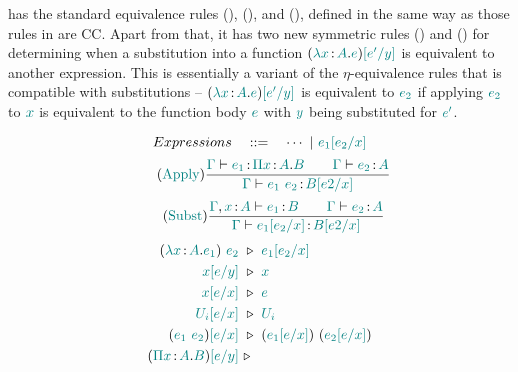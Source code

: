 {\ccs} has the standard equivalence rules (), (), and (), defined in the same way as those rules in are CC. Apart from that, it has two new symmetric rules () and () for determining when a substitution into a function 
$(\color{teal}{\lambda x}\color{black} \hspace{0.5mm}{:}\hspace{0.5mm} \color{teal}{A}\color{black} . \color{teal}{e}\color{black})\color{teal}{[e'\slash y]}\color{black}$ 
is equivalent to another expression. This is essentially a variant of the $\eta$-equivalence rules that is compatible with substitutions -- $(\color{teal}{\lambda x}\color{black} \hspace{0.5mm}{:}\hspace{0.5mm} \color{teal}{A}\color{black} . \color{teal}{e}\color{black})\color{teal}{[e'\slash y]}\color{black}$ is equivalent to $\color{teal}{e_2}\color{black}$ if applying $\color{teal}{e_2}\color{black}$ to $\color{teal}{x}\color{black}$ is equivalent to the function body $\color{teal}{e}\color{black}$ with $\color{teal}{y}\color{black}$ being substituted for $\color{teal}{e'}\color{black}$.

\begin{figure}
\renewcommand{\arraystretch}{1.3}
	\begin{equation*}
		Expressions \quad ::= \quad \cdots\ |\ \helper{e_1\sub{e_2}{x}} 
	\end{equation*}
	\begin{equation}
		\tag{\helper{Apply}}
		\frac
			{\helper{\Gamma} \vdash \helper{e_1} \goodcolon \helper{\Pi x} \goodcolon \helper{A}. \helper{B} \qquad 
			\helper{\Gamma} \vdash \helper{e_2} \goodcolon \helper{A}}
			{\helper{\Gamma} 	\vdash \helper{e_1} \ \helper{e_2} \goodcolon \helper{B\sub{e2}{x}}}
	\end{equation}
	\begin{equation}
		\tag{\helper{Subst}}
		\frac
			{\helper{\Gamma}, \helper{x} \goodcolon \helper{A} \vdash \helper{e_1} \goodcolon \helper{B} \qquad 
			 \helper{\Gamma} \vdash \helper{e_2} \goodcolon \helper{A}}
			{\helper{\Gamma} \vdash \helper{e_1\sub{e_2}{x}} \goodcolon \helper{B\sub{e2}{x}}}
	\end{equation}
	\begin{align*}
		(\helper{\lambda x} \goodcolon \helper{A} . \helper{e_1})\ \helper{e_2}\ &\triangleright\ \helper{e_1\sub{e_2}{x}}\\
		\helper{x\sub{e}{y}}\ &\triangleright\ \helper{x}\\
		\helper{x\sub{e}{x}}\ &\triangleright\ \helper{e}\\
		\helper{U_i\sub{e}{x}}\ &\triangleright\ \helper{U_i}\\
		(\helper{e_1\ e_2})\helper{\sub{e}{x}}\ &\triangleright\ (\helper{e_1\sub{e}{x}})\ (\helper{e_2\sub{e}{x}}) \\
		(\helper{\Pi x} \goodcolon \helper{A}. \helper{B})\helper{\sub{e}{y}}\ &\triangleright\ 

\end{align*}
\end{figure}
